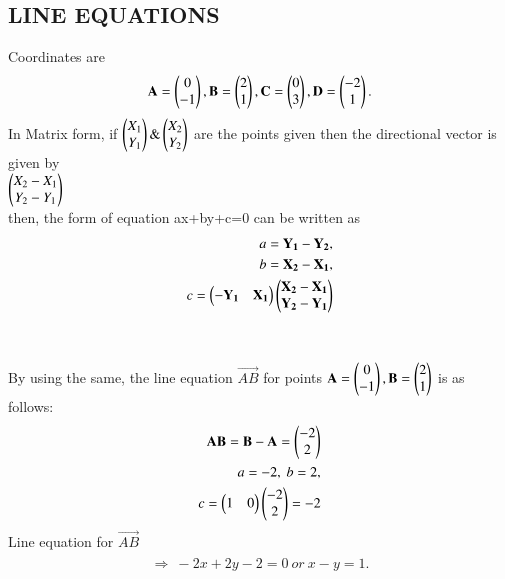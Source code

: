 \documentclass[journal,12pt,twocolumn]{IEEEtran}
\begin{document}
\subsection{LINE EQUATIONS}
Coordinates are
\begin{align}
\begin{split}
\mathbf{A} = \begin{pmatrix}0 \\ -1\end{pmatrix},
\mathbf{B} =\begin{pmatrix}2\\1\end{pmatrix} ,
\mathbf{C} = \begin{pmatrix}0 \\ 3\end{pmatrix},
\mathbf{D} =\begin{pmatrix}-2\\1\end{pmatrix}.
\end{split}
\end{align}
In Matrix form, if $\begin{pmatrix}X_1\\Y_1\end{pmatrix} \&  \begin{pmatrix}X_2\\Y_2\end{pmatrix}$ are the points given then the directional vector is given by \\$\begin{pmatrix}X_2-X_1\\ Y_2-Y_1\end{pmatrix}$ \\then, 
the form of equation ax+by+c=0 can be written as\\ 
\begin{align}
\begin{split}
a= \mathbf{Y_1-Y_2},\\ b=\mathbf{X_2-X_1},\\ c = \begin{pmatrix}-\mathbf{Y_1}&\mathbf{X_1}\end{pmatrix} \begin{pmatrix}\mathbf{X_2-X_1}\\\mathbf{ Y_2-Y_1}\end{pmatrix}
\end{split}
\end{align}
\\
\\
By using the same, the line equation $\vec{AB}$ for points $\mathbf{A} = \begin{pmatrix}0\\-1\end{pmatrix},\mathbf{B}=\begin{pmatrix}2\\1\end{pmatrix}$ is as follows:
\\
\begin{align}
\begin{split}
\mathbf{AB}  = \mathbf{B}-\mathbf{A} =  \begin{pmatrix}-2\\2\end{pmatrix}\\
a=-2,\ b=2,\\
c=\begin{pmatrix}1 & 0\end{pmatrix} \begin{pmatrix}-2\\2\end{pmatrix}=-2\\
\end{split}
\end{align}
Line equation for $\vec{AB}$
\begin{align}
\begin{split}
\Rightarrow\ -2x+2y-2=0 \ or \ x-y=1. \\
\end{split}
\end{align}
\end{document}
